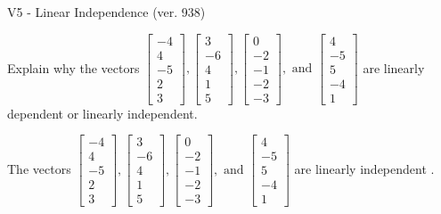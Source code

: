 \begin{exercise}
  \begin{exerciseTitle}V5 - Linear Independence (ver. 938)\end{exerciseTitle}
  \begin{exerciseStatement}
    Explain why the vectors \(\left[\begin{array}{r}
-4 \\
4 \\
-5 \\
2 \\
3
\end{array}\right] , \left[\begin{array}{r}
3 \\
-6 \\
4 \\
1 \\
5
\end{array}\right] , \left[\begin{array}{r}
0 \\
-2 \\
-1 \\
-2 \\
-3
\end{array}\right] , \text{ and } \left[\begin{array}{r}
4 \\
-5 \\
5 \\
-4 \\
1
\end{array}\right]\) are linearly dependent or linearly independent.	


  \end{exerciseStatement}
  \begin{exerciseAnswer}
   The vectors \(\left[\begin{array}{r}
-4 \\
4 \\
-5 \\
2 \\
3
\end{array}\right] , \left[\begin{array}{r}
3 \\
-6 \\
4 \\
1 \\
5
\end{array}\right] , \left[\begin{array}{r}
0 \\
-2 \\
-1 \\
-2 \\
-3
\end{array}\right] , \text{ and } \left[\begin{array}{r}
4 \\
-5 \\
5 \\
-4 \\
1
\end{array}\right]\) are 
  	 linearly independent  .
  


  \end{exerciseAnswer}
\end{exercise}